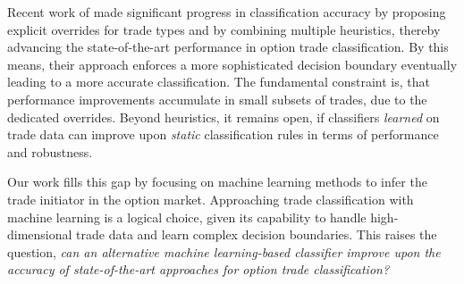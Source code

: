 Recent work of \textcite[\checkmark][13--16]{grauerOptionTradeClassification2022} made significant progress in classification accuracy by proposing explicit overrides for trade types and by combining multiple heuristics, thereby advancing the state-of-the-art performance in option trade classification. By this means, their approach enforces a more sophisticated decision boundary eventually leading to a more accurate classification. The fundamental constraint is, that performance improvements accumulate in small subsets of trades, due to the dedicated overrides. Beyond heuristics, it remains open, if classifiers \emph{learned} on trade data can improve upon \emph{static} classification rules in terms of performance and robustness.

Our work fills this gap by focusing on machine learning methods to infer the trade initiator in the option market. Approaching trade classification with machine learning is a logical choice, given its capability to handle high-dimensional trade data and learn complex decision boundaries. This raises the question, \emph{can an alternative machine learning-based classifier improve upon the accuracy of state-of-the-art approaches for option trade classification?}

